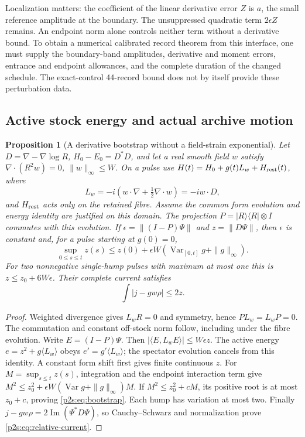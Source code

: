 \documentclass[11pt]{article}
\numberwithin{equation}{section}
\newtheorem{proposition}[theorem]{Proposition}
\theoremstyle{definition}
\theoremstyle{remark}
\begin{document}
Localization matters: the coefficient of the linear derivative error $Z$
is $a$, the small reference amplitude at the boundary. The unsuppressed
quadratic term $2\epsilon Z$ remains. An endpoint norm alone controls
neither term without a derivative bound. To obtain a numerical calibrated
record theorem from this interface, one must supply the boundary-band
amplitudes, derivative and moment errors, entrance and endpoint allowances,
and the complete duration of the changed schedule. The exact-control
44-record bound does not by itself provide these perturbation data.

\subsection{Active stock energy and actual archive motion}
\begin{proposition}[A derivative bootstrap without a field-strain exponential]
\label{p2s:prop:energy}
Let $D=\nabla-\nabla\log R$, $H_0-E_0=D^*D$, and let a real smooth field
$w$ satisfy $\nabla\cdot(R^2w)=0$, $\|w\|_\infty\leq W$.
On a pulse use $H(t)=H_0+g(t)L_w+H_{\rm rest}(t)$, where
\[
 L_w=-i(w\cdot\nabla+\tfrac12\nabla\cdot w)=-iw\cdot D,
\]
and $H_{\rm rest}$ acts only on the retained fibre. Assume the common form
evolution and energy identity are justified on this domain. The projection
$P=|R\rangle\langle R|\otimes I$ commutes with this evolution. If
$\epsilon=\|(I-P)\Psi\|$ and $z=\|D\Psi\|$, then $\epsilon$ is constant
and, for a pulse starting at $g(0)=0$,
\begin{equation}\label{p2s:eq:bootstrap}
 \sup_{0\leq s\leq t}z(s)
 \leq z(0)+\epsilon W(\operatorname{Var}_{[0,t]}g+\|g\|_\infty).
\end{equation}
For two nonnegative single-hump pulses with maximum at most one this is
$z\leq z_0+6W\epsilon$. Their complete current satisfies
\begin{equation}\label{p2s:eq:relative-current}
 \int|j-gw\rho|\leq2z.
\end{equation}
\end{proposition}
\begin{proof}
Weighted divergence gives $L_wR=0$ and symmetry, hence $PL_w=L_wP=0$.
The commutation and constant off-stock norm follow, including under the
fibre evolution. Write $E=(I-P)\Psi$. Then
$|\langle E,L_wE\rangle|\leq W\epsilon z$.
The active energy $e=z^2+g\langle L_w\rangle$ obeys
$e'=g'\langle L_w\rangle$; the spectator evolution cancels from this
identity. A constant form shift first gives finite continuous $z$.
For $M=\sup_{s\leq t}z(s)$, integration and the endpoint interaction term
give $M^2\leq z_0^2+\epsilon W(\operatorname{Var}g+\|g\|_\infty)M$.
If $M^2\leq z_0^2+cM$, its positive root is at most $z_0+c$, proving
\eqref{p2s:eq:bootstrap}. Each hump has variation at most two.
Finally $j-gw\rho=2\operatorname{Im}(\Psi^*D\Psi)$, so Cauchy--Schwarz
and normalization prove \eqref{p2s:eq:relative-current}.
\end{proof}
\end{document}
